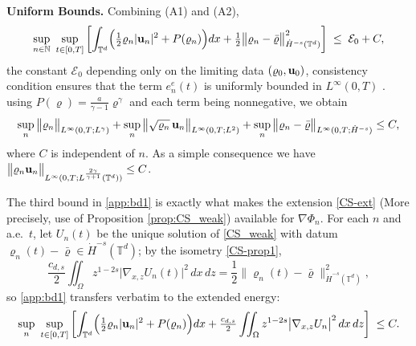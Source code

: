\documentclass[12pt,a4paper,twoside]{article}
\newcommand{\vr}{\varrho}
\newcommand{\vu}{\vc{u}}
\newcommand{\vc}[1]{{\bf #1}}
\newcommand{\Grad}{\nabla}
\numberwithin{equation}{section}%
\begin{document}
\textbf{{Uniform Bounds.}}
\medskip
Combining (A1) and (A2),
\begin{equation*}
	\sup_{n\in\mathbb{N}}\ \sup_{t\in[0,T]} \left[ \int_{\mathbb{T}^d}\!\Big( \tfrac12 \vr_n|\vu_n|^2 + P(\vr_n) \Big)dx + \tfrac12\big\|\vr_n-\bar\vr\big\|_{\dot H^{-s}(\mathbb{T}^d)}^2 \right] \;\le\; \mathcal{E}_0 + C,
\end{equation*}
the constant $\mathcal{E}_0$ depending only on the limiting data $(\vr_0,\vu_0)$, consistency condition ensures that the term $ e_n^{e}(t) $ is uniformly bounded in $L^\infty(0,T)$ . using $P(\vr)=\tfrac{a}{\gamma-1}\vr^\gamma$ and each term being nonnegative, we obtain
\begin{equation}\label{app:bd1}
	\sup_n \big\| \vr_n \big\|_{L^\infty(0,T; L^\gamma)} +
	\sup_n \big\| \sqrt{\vr_n}\,\vu_n \big\|_{L^\infty(0,T; L^2)} +
	\sup_n \big\| \vr_n - \bar\vr \big\|_{L^\infty(0,T; \dot H^{-s})} \leq C,
\end{equation}
where $C$ is independent of $n$. As a simple consequence we have $ 	\big\| \vr_n\vu_n \big\|_{L^\infty(0,T;L^{\frac{2\gamma}{\gamma+1}}(\mathbb{T}^d))}
\leq C$.

\medskip
The third bound in \eqref{app:bd1} is exactly what makes the extension \eqref{CS-ext} (More precisely, use of Proposition \ref{prop:CS_weak}) available for $\nabla \Phi_n$. For each $n$ and a.e.\ $t$, let $U_n(t)$ be the unique solution of \eqref{CS_weak} with datum $\vr_n(t)-\bar\vr \in \dot H^{-s}(\mathbb{T}^d)$; by the isometry \eqref{CS-prop1},
\begin{equation}\label{app-bd-ext1}
	\frac{c_{d,s}}{2}\iint_{\Omega} z^{1-2s}\big|\Grad_{x,z}U_n(t)\big|^2\,dx\,dz
	= \frac12 \big\| \vr_n(t)-\bar\vr \big\|_{\dot H^{-s}(\mathbb{T}^d)}^2 ,
\end{equation}
so \eqref{app:bd1} transfers verbatim to the extended energy:
\begin{equation}\label{app:ba1-ext}
	\sup_n\ \sup_{t\in[0,T]} \left[ \int_{\mathbb{T}^d}\!\Big( \tfrac12 \vr_n|\vu_n|^2 + P(\vr_n) \Big)dx + \tfrac{c_{d,s}}{2}\iint_{\Omega} z^{1-2s}\big|\Grad_{x,z}U_n\big|^2\,dx\,dz \right] \;\leq C .
\end{equation}


\medskip
\noindent
\end{document}
